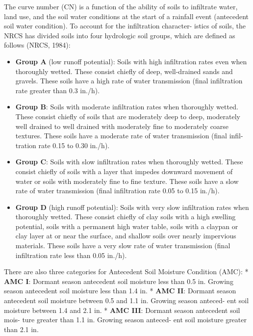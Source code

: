 \documentclass[
  letterpaper,
  DIV=11,
  numbers=noendperiod]{scrreprt}
\providecommand{\tightlist}{%
  \setlength{\itemsep}{0pt}\setlength{\parskip}{0pt}}\usepackage{longtable,booktabs,array}
\begin{document}
The curve number (CN) is a function of the ability of soils to
infiltrate water, land use, and the soil water conditions at the start
of a rainfall event (antecedent soil water condition). To account for
the infiltration character- istics of soils, the NRCS has divided soils
into four hydrologic soil groups, which are defined as follows (NRCS,
1984):

\begin{itemize}
\tightlist
\item
  \textbf{Group A} (low runoff potential): Soils with high infiltration
  rates even when thoroughly wetted. These consist chiefly of deep,
  well-drained sands and gravels. These soils have a high rate of water
  transmission (final infiltration rate greater than 0.3 in./h).
\item
  \textbf{Group B}: Soils with moderate infiltration rates when
  thoroughly wetted. These consist chiefly of soils that are moderately
  deep to deep, moderately well drained to well drained with moderately
  fine to moderately coarse textures. These soils have a moderate rate
  of water transmission (final infil- tration rate 0.15 to 0.30 in./h).
\item
  \textbf{Group C}: Soils with slow infiltration rates when thoroughly
  wetted. These consist chiefly of soils with a layer that impedes
  downward movement of water or soils with moderately fine to fine
  texture. These soils have a slow rate of water transmission (final
  infiltration rate 0.05 to 0.15 in./h).
\item
  \textbf{Group D} (high runoff potential): Soils with very slow
  infiltration rates when thoroughly wetted. These consist chiefly of
  clay soils with a high swelling potential, soils with a permanent high
  water table, soils with a claypan or clay layer at or near the
  surface, and shallow soils over nearly impervious materials. These
  soils have a very slow rate of water transmission (final infiltration
  rate less than 0.05 in./h).
\end{itemize}

There are also three categories for Antecedent Soil Moisture Condition
(AMC): * \textbf{AMC I}: Dormant season antecedent soil moisture less
than 0.5 in. Growing season antecedent soil moisture less than 1.4 in. *
\textbf{AMC II}: Dormant season antecedent soil moisture between 0.5 and
1.1 in. Growing season anteced- ent soil moisture between 1.4 and 2.1
in. * \textbf{AMC III}: Dormant season antecedent soil mois- ture
greater than 1.1 in. Growing season anteced- ent soil moisture greater
than 2.1 in.
\end{document}
